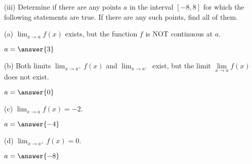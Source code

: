 \documentclass{ximera}
\begin{document}
\begin{exercise}
(iii) Determine if there are any points $a$ in the interval $[-8,8]$ for which the following statements are true. If there are any such points, find all of them.

(a) $\lim_{x\to a} f(x)$ exists, but the function $f$ is NOT continuous at $a$.
\begin{prompt}
\begin{multipleChoice}
\end{multipleChoice}

\begin{exercise}
$a=\answer{3}$
\end{exercise}
\end{prompt}

(b) Both limits $\lim_{x\to a^+} f(x)$ and $\lim_{x\to a^-}$ exist, but the limit $\lim\limits_{x\to a} f(x)$ does not exist.

\begin{prompt}
\begin{multipleChoice}
\end{multipleChoice}

\begin{exercise}
$a=\answer{0}$
\end{exercise}
\end{prompt}

(c) $\lim_{x\to a} f(x)=-2$.

\begin{prompt}
\begin{multipleChoice}
\end{multipleChoice}

\begin{exercise}
$a=\answer{-4}$
\end{exercise}
\end{prompt}

(d) $\lim_{x\to a^+} f(x)=0$.
\begin{prompt}
\begin{multipleChoice}
\end{multipleChoice}

\begin{exercise}
$a=\answer{-8}$
\end{exercise}
\end{prompt}


\end{exercise}
\end{document}
